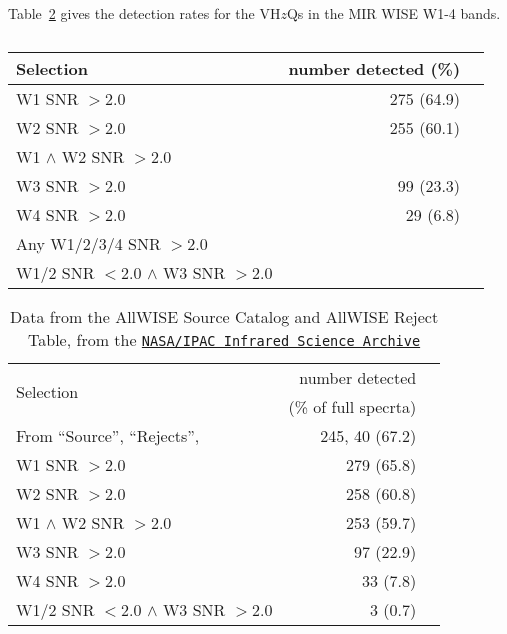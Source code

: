 \documentclass[usenatbib]{mnras}
\begin{document}
    Table~\ref{tab:mir_detection} gives the detection rates for the
    VH$z$Qs in the MIR WISE W1-4 bands. 
    \begin{table}
      \begin{tabular}{l r l}
        \hline  \hline
        Selection   & number detected (\%) \\
        \hline  
        W1 SNR $> 2.0$                                             &  275  (64.9) \\
        W2 SNR $> 2.0$                                            &   255 (60.1) \\
        W1 $\land$ W2 SNR $> 2.0$                         &  \\
        W3 SNR $> 2.0$                                            &  99    (23.3) \\
        W4 SNR $> 2.0$                                            &  29    (6.8) \\
        Any W1/2/3/4 SNR $>2.0$                           & \\
        W1/2 SNR $< 2.0$ $\land$ W3 SNR $>2.0$ & \\
        \hline  \hline
      \end{tabular}
      \caption{}
      \label{tab:mir_detection}
    \end{table}

    \begin{table}
      \begin{tabular}{l r l}
        \hline  \hline
         \multirow{2}{*}{Selection}   & number detected \\ 
                                                   & (\% of full specrta) \\
        \hline  
        From ``Source'', ``Rejects'',                    & 245, 40  (67.2) \\
        W1 SNR $> 2.0$                                       &  279  (65.8) \\
        W2 SNR $> 2.0$                                       &  258 (60.8) \\
        W1 $\land$ W2 SNR $> 2.0$                    & 253   (59.7)  \\
        W3 SNR $> 2.0$                                     &  97    (22.9) \\
        W4 SNR $> 2.0$                                     &  33    (7.8) \\
        W1/2 SNR $< 2.0$ $\land$ W3 SNR $>2.0$ &  3 (0.7)\\
        \hline  \hline
      \end{tabular}
      \caption{Data from the AllWISE Source Catalog and AllWISE Reject Table, from the 
\href{https://irsa.ipac.caltech.edu/cgi-bin/Gator/nph-scan?submit=Select&projshort=WISE} {{\tt NASA/IPAC  Infrared Science Archive}}}
      \label{tab:mir_detection}
    \end{table}
    
\end{document}
